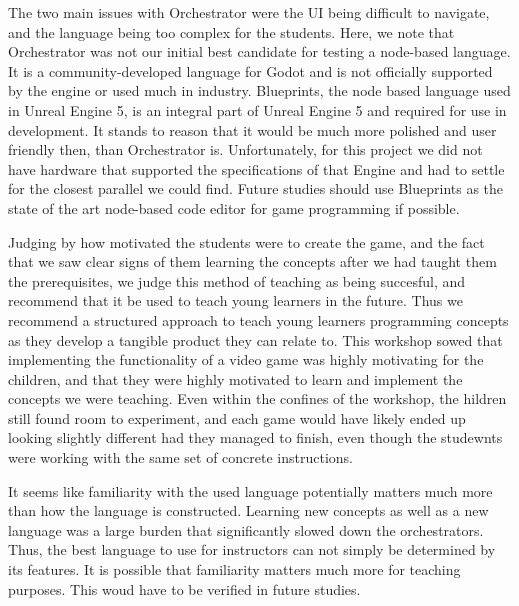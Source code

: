 The two main issues with Orchestrator were the UI being difficult to
navigate, and the language being too complex for the students.
Here,
we note that Orchestrator was not our initial best candidate for
testing a node-based language.
It is a community-developed language
for Godot and is not officially supported by the engine or used much
in industry.
Blueprints, the node based language used in Unreal
Engine 5, is an integral part of Unreal Engine 5 and required for use
in development.
It stands to reason that it would be much more
polished and user friendly then, than Orchestrator is.
Unfortunately,
for this project we did not have hardware that supported the
specifications of that Engine and had to settle for the closest
parallel we could find.
Future studies should use Blueprints as the
state of the art node-based code editor for game programming if
possible.

Judging by how
motivated the students were to create the game, and the fact that
 we saw clear signs of them learning the concepts after we had
taught them the prerequisites, we judge this method of teaching as
being succesful, and recommend that it be used to teach young
learners in the future.
Thus we recommend a structured approach to
teach young learners programming concepts as they develop a tangible
product they can relate to.
This workshop sowed that implementing the
functionality of a video game was highly motivating for the children,
and that they were highly motivated to learn and implement the
concepts we were teaching.
Even within the confines of the workshop,
the hildren still found room to experiment, and each game would have
likely ended up looking slightly different had they managed to
finish, even though the studewnts were working with the same set of
concrete instructions.

It seems like familiarity with the used language potentially matters much more than
how the language is constructed.
Learning new concepts as well as a
new language was a large burden that significantly slowed down the
orchestrators.
Thus, the best language to use for
instructors can not simply be determined by its features.
It is
possible that familiarity matters much more for teaching purposes. This woud have to be verified in future studies.
